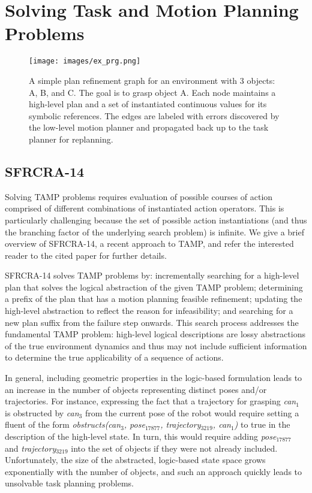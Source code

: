 \section{Solving Task and Motion Planning Problems}
\begin{figure}[t]
  \centering
    \texttt{[image: images/ex\_prg.png]}
  \caption{\small{A simple plan refinement graph for an environment with 3 objects: A,
B, and C. The goal is to grasp object A. Each node maintains a high-level
plan and a set of instantiated continuous values for its symbolic references.
The edges are labeled with errors discovered by the low-level motion planner and
propagated back up to the task planner for replanning.}}
  \label{fig:prg}
\end{figure}

\subsection{SFRCRA-14}
Solving TAMP problems requires evaluation of
possible courses of action comprised of different combinations of
instantiated action operators. This is particularly challenging
because the set of possible action instantiations (and thus the
branching factor of the underlying search problem) is infinite.
We give a brief overview of SFRCRA-14, a recent approach to TAMP, and
refer the interested reader to the cited paper for further details.

SFRCRA-14 solves TAMP problems by: incrementally
searching for a high-level plan that solves the logical abstraction
of the given TAMP problem; determining a prefix of the plan that has a
motion planning feasible refinement; updating the high-level
abstraction to reflect the reason for infeasibility; and searching for
a new plan suffix from the failure step onwards. This search process
addresses the fundamental TAMP problem: high-level
logical descriptions are lossy abstractions of the true environment
dynamics and thus may not include sufficient information to
determine the true applicability of a sequence of actions.

In general, including geometric properties in the logic-based formulation leads to an
increase in the number of objects representing distinct poses and/or trajectories. For
instance, expressing the fact that a trajectory for grasping \emph{can$_1$} is obstructed by
\emph{can$_3$} from the current pose of the robot would require setting a fluent of the
form \emph{obstructs(can$_3$, pose$_{17877}$, trajectory$_{3219}$, can$_1$)} to true in
the description of the high-level state. In turn, this would require adding
\emph{pose$_{17877}$} and \emph{trajectory$_{3219}$} into the set of objects if they were
not already included. Unfortunately, the size of the abstracted, logic-based state space
grows exponentially with the number of objects, and such an approach quickly leads to
unsolvable task planning problems.

